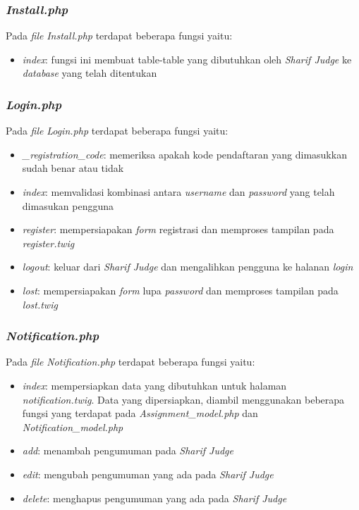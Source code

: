 \subsubsection{\textit{Install.php}}
Pada \textit{file} \textit{Install.php} terdapat beberapa fungsi yaitu:
\begin{itemize}
	\item \textit{index}: fungsi ini membuat table-table yang dibutuhkan oleh \textit{Sharif Judge} ke \textit{database} yang telah ditentukan
\end{itemize}

\subsubsection{\textit{Login.php}}
Pada \textit{file} \textit{Login.php} terdapat beberapa fungsi yaitu:
\begin{itemize}
	\item \textit{\_registration\_code}: memeriksa apakah kode pendaftaran yang dimasukkan sudah benar atau tidak
	\item \textit{index}: memvalidasi kombinasi antara \textit{username} dan \textit{password} yang telah dimasukan pengguna
	\item \textit{register}: mempersiapakan \textit{form} registrasi dan memproses tampilan pada \textit{register.twig}
	\item \textit{logout}: keluar dari \textit{Sharif Judge} dan mengalihkan pengguna ke halanan \textit{login}
	\item \textit{lost}: mempersiapakan \textit{form} lupa \textit{password} dan memproses tampilan pada \textit{lost.twig}
\end{itemize}

\subsubsection{\textit{Notification.php}}
Pada \textit{file} \textit{Notification.php} terdapat beberapa fungsi yaitu:
\begin{itemize}
	\item \textit{index}: mempersiapkan data yang dibutuhkan untuk halaman \textit{notification.twig}. Data yang dipersiapkan, diambil menggunakan beberapa fungsi yang terdapat pada \textit{Assignment\_model.php} dan \textit{Notification\_model.php}
	\item \textit{add}: menambah pengumuman pada \textit{Sharif Judge}
	\item \textit{edit}: mengubah pengumuman yang ada pada \textit{Sharif Judge}
	\item \textit{delete}: menghapus pengumuman yang ada pada \textit{Sharif Judge}
\end{itemize}

